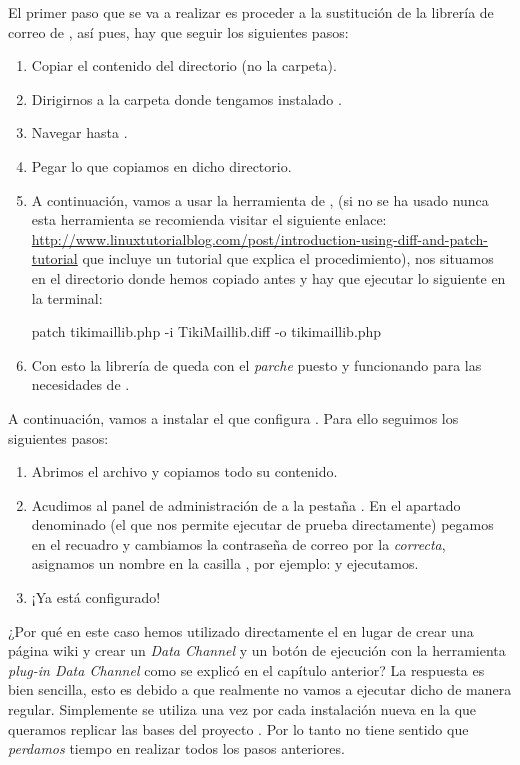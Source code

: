 El primer paso que se va a realizar es proceder a la sustitución de la librería de correo de \tiki{}, así pues, hay que seguir los siguientes pasos:

\begin{enumerate}
\item Copiar el contenido del directorio  (no la carpeta).
\item Dirigirnos a la carpeta donde tengamos instalado \tiki{}.
\item Navegar hasta .
\item Pegar lo que copiamos en dicho directorio.
\item A continuación, vamos a usar la herramienta de ,  (si no se ha usado nunca esta herramienta se recomienda visitar el siguiente enlace: \url{http://www.linuxtutorialblog.com/post/introduction-using-diff-and-patch-tutorial} que incluye un tutorial que explica el procedimiento), nos situamos en el directorio donde hemos copiado antes y hay que ejecutar lo siguiente en la terminal:
\begin{pyglist}[language=bash]
patch tikimaillib.php -i TikiMaillib.diff -o tikimaillib.php
\end{pyglist}
\item Con esto la librería de \tiki{} queda con el \textit{parche} puesto y funcionando para las necesidades de \alma{}.
\end{enumerate}

A continuación, vamos a instalar el \profile{} que configura \alma{}. Para ello seguimos los siguientes pasos:

\begin{enumerate}
\item Abrimos el archivo  y copiamos todo su contenido.
\item Acudimos al panel de administración de \profiles{} a la pestaña . En el apartado denominado  (el que nos permite ejecutar \profiles{} de prueba directamente) pegamos en el recuadro y cambiamos la contraseña de correo por la \textit{correcta}, asignamos un nombre en la casilla , por ejemplo:  y ejecutamos.
\item ¡Ya está \alma{} configurado!
\end{enumerate}

¿Por qué en este caso hemos utilizado directamente el  en lugar de crear una página wiki y crear un \textit{Data Channel} y un botón de ejecución con la herramienta \textit{plug-in Data Channel} como se explicó en el capítulo anterior? La respuesta es bien sencilla, esto es debido a que realmente no vamos a ejecutar dicho \profile{} de manera regular. Simplemente se utiliza una vez por cada instalación nueva en la que queramos replicar las bases del proyecto \alma{}. Por lo tanto no tiene sentido que \textit{perdamos} tiempo en realizar todos los pasos anteriores.


